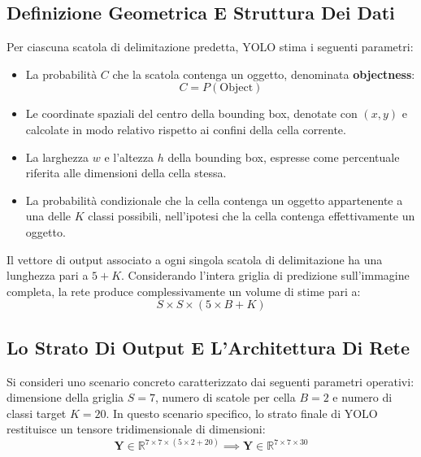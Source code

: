 ﻿\documentclass[11pt, a4paper]{article}
\begin{document}
\subsection{Definizione Geometrica E Struttura Dei Dati}

Per ciascuna scatola di delimitazione predetta, YOLO stima i seguenti parametri:

\begin{itemize}
    \item La probabilità $C$ che la scatola contenga un oggetto, denominata \textbf{objectness}:
    \[
    C = P(\text{Object})
    \]
    \item Le coordinate spaziali del centro della bounding box, denotate con $(x, y)$ e calcolate in modo relativo rispetto ai confini della cella corrente.
    \item La larghezza $w$ e l'altezza $h$ della bounding box, espresse come percentuale riferita alle dimensioni della cella stessa.
    \item La probabilità condizionale che la cella contenga un oggetto appartenente a una delle $K$ classi possibili, nell'ipotesi che la cella contenga effettivamente un oggetto.
\end{itemize}


Il vettore di output associato a ogni singola scatola di delimitazione ha una lunghezza pari a $5 + K$. Considerando l'intera griglia di predizione sull'immagine completa, la rete produce complessivamente un volume di stime pari a:
\[
\boxed{S \times S \times (5 \times B + K)}
\]

\newpage

\subsection{Lo Strato Di Output E L'Architettura Di Rete}

Si consideri uno scenario concreto caratterizzato dai seguenti parametri operativi: dimensione della griglia $S = 7$, numero di scatole per cella $B = 2$ e numero di classi target $K = 20$. In questo scenario specifico, lo strato finale di YOLO restituisce un tensore tridimensionale di dimensioni:
\[
\bm{Y} \in \mathbb{R}^{7 \times 7 \times (5 \times 2 + 20)} \implies \bm{Y} \in \mathbb{R}^{7 \times 7 \times 30}
\]
\end{document}
